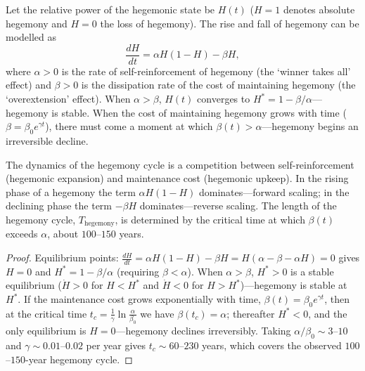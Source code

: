 \begin{proposition}\label{prop:hegemony_dynamics}
Let the relative power of the hegemonic state be $H(t)$ ($H = 1$ denotes absolute hegemony and $H = 0$ the loss of hegemony). The rise and fall of hegemony can be modelled as
\[
\frac{dH}{dt} = \alpha H(1-H) - \beta H,
\]
where $\alpha > 0$ is the rate of self-reinforcement of hegemony (the `winner takes all' effect) and $\beta > 0$ is the dissipation rate of the cost of maintaining hegemony (the `overextension' effect). When $\alpha > \beta$, $H(t)$ converges to $H^* = 1 - \beta/\alpha$---hegemony is stable. When the cost of maintaining hegemony grows with time ($\beta = \beta_0 e^{\gamma t}$), there must come a moment at which $\beta(t) > \alpha$---hegemony begins an irreversible decline.

The dynamics of the hegemony cycle is a competition between self-reinforcement (hegemonic expansion) and maintenance cost (hegemonic upkeep). In the rising phase of a hegemony the term $\alpha H(1-H)$ dominates---forward scaling; in the declining phase the term $-\beta H$ dominates---reverse scaling. The length of the hegemony cycle, $T_{\text{hegemony}}$, is determined by the critical time at which $\beta(t)$ exceeds $\alpha$, about $100$--$150$ years.
\end{proposition}

\begin{proof}
Equilibrium points: $\frac{dH}{dt} = \alpha H(1-H) - \beta H = H(\alpha - \beta - \alpha H) = 0$ gives $H = 0$ and $H^* = 1 - \beta/\alpha$ (requiring $\beta < \alpha$). When $\alpha > \beta$, $H^* > 0$ is a stable equilibrium ($\dot H > 0$ for $H < H^*$ and $\dot H < 0$ for $H > H^*$)---hegemony is stable at $H^*$. If the maintenance cost grows exponentially with time, $\beta(t) = \beta_0 e^{\gamma t}$, then at the critical time $t_c = \frac{1}{\gamma}\ln\frac{\alpha}{\beta_0}$ we have $\beta(t_c) = \alpha$; thereafter $H^* < 0$, and the only equilibrium is $H = 0$---hegemony declines irreversibly. Taking $\alpha/\beta_0 \sim 3$--$10$ and $\gamma \sim 0.01$--$0.02$ per year gives $t_c \sim 60$--$230$ years, which covers the observed $100$--$150$-year hegemony cycle.
\end{proof}

